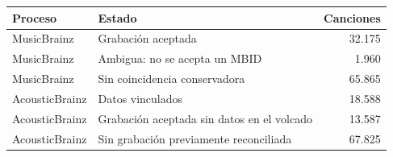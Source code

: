 \begin{center}\small
{}\label{tab:estados_vinculacion}
\begin{tabularx}{\linewidth}{@{}p{3.0cm} Y r@{}}
\toprule
\textbf{Proceso} & \textbf{Estado} & \textbf{Canciones} \\
\midrule
MusicBrainz & Grabación aceptada & 32.175 \\
MusicBrainz & Ambigua: no se acepta un MBID & 1.960 \\
MusicBrainz & Sin coincidencia conservadora & 65.865 \\
AcousticBrainz & Datos vinculados & 18.588 \\
AcousticBrainz & Grabación aceptada sin datos en el volcado & 13.587 \\
AcousticBrainz & Sin grabación previamente reconciliada & 67.825 \\
\bottomrule
\end{tabularx}
\end{center}

